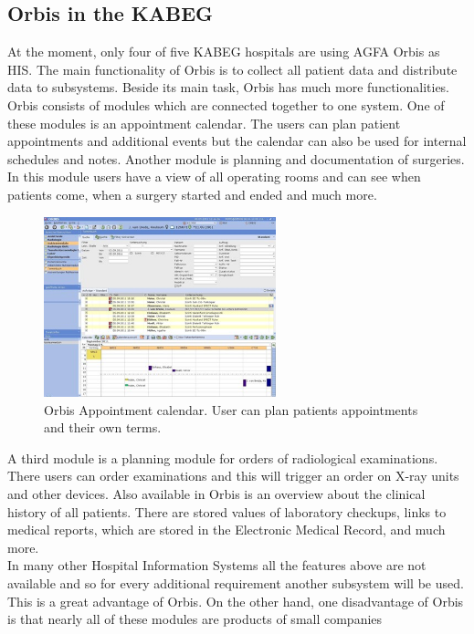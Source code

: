 \documentclass[a4paper]{article}
\begin{document}
	\subsection{Orbis in the KABEG}
	At the moment, only four of five KABEG hospitals are using AGFA Orbis as HIS.
	The main functionality of Orbis is to collect all patient data and distribute
	data to subsystems. Beside its main task, Orbis has much more
	functionalities.\\
	Orbis consists of modules which are connected together to one system. One
	of these modules is an appointment calendar. The users can plan
	patient appointments and additional events but the calendar can also be used
	for internal schedules and notes.
	Another module is planning and documentation of surgeries. In this module
	users have a view of all operating rooms and can see when patients
	come, when a surgery started and ended and much more.\\
	\begin{figure}[!ht]
		  \centering
		      \includegraphics[width=0.6\textwidth]{orbis1}
		  \caption{Orbis Appointment calendar. User can plan 
		  patients appointments and their own terms.}
	\end{figure}
	A third module is a planning module for orders of radiological
	examinations. There users can order examinations and this will trigger an
	order on X-ray units and other devices. Also available in Orbis is an 
	overview about the clinical history of all patients. There are
	stored values of laboratory checkups, links to medical reports, which are
	stored in the Electronic Medical Record, and much more.\\
	In many other Hospital Information Systems all the features above are not
	available and so for every additional requirement another subsystem will be
	used.
	This is a great advantage of Orbis. On the other hand, one disadvantage of
	Orbis is that nearly all of these modules are products of small companies
\end{document}
